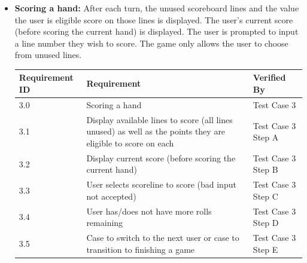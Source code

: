 \documentclass[]{report}   %
\begin{document}
\begin{itemize}
\item \textbf{Scoring a hand:} After each turn, the unused scoreboard lines and the value the user is eligible score on those lines is displayed. The user's current score (before scoring the current hand) is displayed. The user is prompted to input a line number they wish to score. The game only allows the user to choose from unused lines. 
    \begin{center}
    \begin{tabular}{ | l | p{3.5in} | l | }
    \hline
    \textbf{Requirement ID} & \textbf{Requirement} & \textbf{Verified By} \\ \hline
    3.0 & Scoring a hand & Test Case 3\\ \hline
    3.1 & Display available lines to score (all lines unused) as well as the points they are eligible to score on each  & Test Case 3 Step A\\ \hline
    3.2 & Display current score (before scoring the current hand) & Test Case 3 Step B\\ \hline
    3.3 & User selects scoreline to score (bad input not accepted) & Test Case 3 Step C\\ \hline
    3.4 & User has/does not have more rolls remaining & Test Case 3 Step D\\ \hline
    3.5 & Case to switch to the next user or case to transition to finishing a game & Test Case 3 Step E\\ \hline
    \end{tabular}
    \end{center}
    

\end{itemize}
\end{document}
